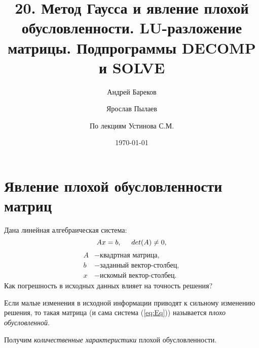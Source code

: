 \documentclass[a4paper,11pt]{article}
\title{20. Метод Гаусса и явление плохой обусловленности. LU-разложение матрицы. Подпрограммы DECOMP и SOLVE}
\author{Андрей Бареков \and Ярослав Пылаев \and По лекциям Устинова С.М.}
\date{\today}
\begin{document}
\maketitle
\newpage

\section{Явление плохой обусловленности матриц}
Дана линейная алгебраическая система:
\begin{equation}
  Ax=b, \hspace{5mm} det(A) \ne 0,
  \label{eq:Eq}
\end{equation}
\begin{align*}
  A &- \text{квадртная матрица}, \\
  b &- \text{заданный вектор-столбец}, \\
  x &- \text{искомый вектор-столбец}.
\end{align*}
Как погрешность в исходных данных влияет на точность решения?
\begin{importantblock}
  Если малые изменения в исходной информации приводят к сильному изменению решения, то такая матрица (и сама система (\ref{eq:Eq})) называется \textit{плохо обусловленной}.
\end{importantblock}
\vspace{3mm}
\noindent Получим \textit{количественные характеристики} плохой обусловленности.
\end{document}
